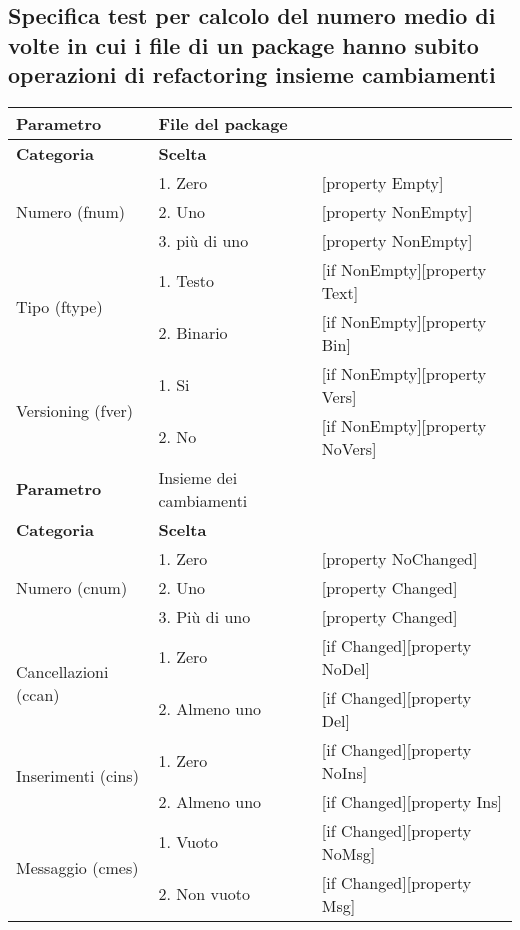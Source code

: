 \clearpage

\subsection{Specifica test per calcolo del numero medio di volte in cui i file di un package hanno subito operazioni di refactoring insieme cambiamenti}

		\begin{table}[ht]
		\footnotesize
		\centering
			\begin{tabular}{|p{4cm}|p{4cm}p{5cm}|}
				\hline
				\cellcolor{Gray} \textbf{Parametro}		& File del package	&											\tabularnewline
				\hline
				\rowcolor{Gray}
				\textbf{Categoria} 						& \textbf{Scelta}			&									\tabularnewline
				\hline
				\multirow{3}{*}{Numero (fnum)} 			& 1. Zero 					&	[property Empty] 				\tabularnewline
				\cline{2-3}
														& 2. Uno 					&	[property NonEmpty]				\tabularnewline
				\cline{2-3}
														& 3. più di uno 			&	[property NonEmpty]				\tabularnewline
				\hline
				\multirow{2}{*}{Tipo (ftype)} 			& 1. Testo					&	[if NonEmpty][property Text] 	\tabularnewline
				\cline{2-3}
														& 2. Binario				&	[if NonEmpty][property Bin]		\tabularnewline
				\hline
				\multirow{2}{*}{Versioning (fver)}		& 1. Si						&	[if NonEmpty][property Vers]	\tabularnewline
				\cline{2-3}
														& 2. No						&	[if NonEmpty][property NoVers]	\tabularnewline
				\hline
				
				
				\cellcolor{Gray} \textbf{Parametro}		& Insieme dei cambiamenti	&									\tabularnewline
				\hline
				\rowcolor{Gray}
				\textbf{Categoria} 						& \textbf{Scelta}			&									\tabularnewline
				\hline
				\multirow{3}{*}{Numero (cnum)} 			& 1. Zero 					&	[property NoChanged]			\tabularnewline
				\cline{2-3}
														& 2. Uno					&	[property Changed]				\tabularnewline
				\cline{2-3}
														& 3. Più di uno				&	[property Changed]				\tabularnewline
				\hline
				\multirow{2}{*}{Cancellazioni (ccan)} 	& 1. Zero	 				&	[if Changed][property NoDel] 	\tabularnewline
				\cline{2-3}
														& 2. Almeno uno				&	[if Changed][property Del]		\tabularnewline
				\hline
				\multirow{2}{*}{Inserimenti (cins)} 	& 1. Zero 					&	[if Changed][property NoIns] 	\tabularnewline
				\cline{2-3}
														& 2. Almeno uno 			&	[if Changed][property Ins]		\tabularnewline
				\hline
				\multirow{2}{*}{Messaggio (cmes)} 		& 1. Vuoto 					&	[if Changed][property NoMsg] 	\tabularnewline
				\cline{2-3}
														& 2. Non vuoto 				&	[if Changed][property Msg]		\tabularnewline
				\hline			
				
			\end{tabular}
		\end {table}
		
